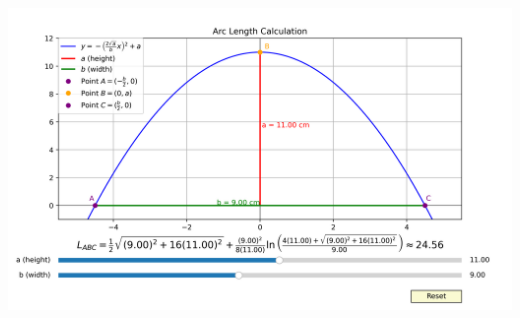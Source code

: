 \documentclass[a4paper, 12pt]{report}
\def\link{blue!50!black}
\begin{document}
    \includegraphics[width=1\textwidth]{images/Figure_1.png}\\
    
    

    
\end{document}
